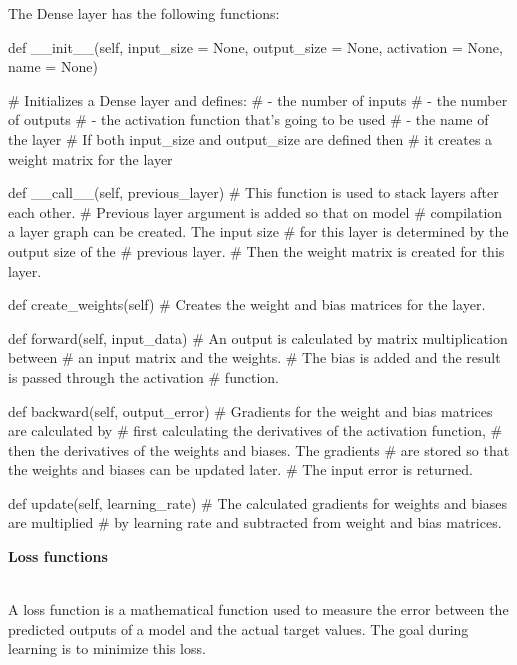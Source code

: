 \documentclass{article}
\begin{document}
    The Dense layer has the following functions:
\begin{python}
def __init__(self,
             input_size  = None,
             output_size = None,
             activation  = None,
             name        = None)

# Initializes a Dense layer and defines:
#       - the number of inputs
#       - the number of outputs
#       - the activation function that's going to be used
#       - the name of the layer
# If both input_size and output_size are defined then
# it creates a weight matrix for the layer
\end{python}
\begin{python}
def __call__(self,
             previous_layer)
# This function is used to stack layers after each other.
# Previous layer argument is added so that on model 
# compilation a layer graph can be created. The input size 
# for this layer is determined by the output size of the 
# previous layer.
# Then the weight matrix is created for this layer.
\end{python}
\begin{python}
def create_weights(self)
# Creates the weight and bias matrices for the layer.
\end{python}
\begin{python}
def forward(self,
            input_data)
# An output is calculated by matrix multiplication between
# an input matrix  and the weights.
# The bias is added and the result is passed through the activation 
# function.
\end{python}
\begin{python}
def backward(self,
             output_error)
# Gradients for the weight and bias matrices are calculated by
# first calculating the derivatives of the activation function,
# then the derivatives of the weights and biases. The gradients 
# are stored so that the weights and biases can be updated later.
# The input error is returned.
\end{python}
\begin{python}
def update(self,
           learning_rate)
# The calculated gradients for weights and biases are multiplied
# by learning rate and subtracted from weight and bias matrices.
\end{python}
\clearpage

    \hypertarget{losses}{\textbf{Loss functions}} \\

    A loss function is a mathematical function used to measure the 
    error between the predicted outputs of a model and the actual 
    target values. The goal during learning is to minimize this loss. \\
\end{document}
